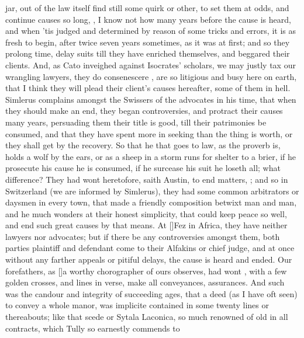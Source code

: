 {jar, out of the law itself find still some quirk or other, to set them
at odds, and continue causes so long, , I know not how
many years before the cause is heard, and when 'tis judged and
determined by reason of some tricks and errors, it is as fresh to
begin, after twice seven years sometimes, as it was at first; and so
they prolong time, delay suits till they have enriched themselves, and
beggared their clients. And, as Cato inveighed against Isocrates'
scholars, we may justly tax our wrangling lawyers, they do consenescere
, are so litigious and busy here on earth, that I think they
will plead their client's causes hereafter, some of them in hell. 
Simlerus complains amongst the Swissers of the advocates in his time,
that when they should make an end, they began controversies, and
protract their causes many years, persuading them their title is good,
till their patrimonies be consumed, and that they have spent more in
seeking than the thing is worth, or they shall get by the recovery. So
that he that goes to law, as the proverb is, holds a wolf by the
ears, or as a sheep in a storm runs for shelter to a brier, if he
prosecute his cause he is consumed, if he surcease his suit he loseth
all; what difference? They had wont heretofore, saith Austin, to
end matters, ; and so in Switzerland (we are
informed by Simlerus), they had some common arbitrators or daysmen
in every town, that made a friendly composition betwixt man and man,
and he much wonders at their honest simplicity, that could keep peace
so well, and end such great causes by that means. At [\baselineskip]Fez in
Africa, they have neither lawyers nor advocates; but if there be any
controversies amongst them, both parties plaintiff and defendant come
to their Alfakins or chief judge, and at once without any farther
appeals or pitiful delays, the cause is heard and ended. Our
forefathers, as [\baselineskip]a worthy chorographer of ours observes, had wont
, with a few golden crosses, and lines in
verse, make all conveyances, assurances. And such was the candour and
integrity of succeeding ages, that a deed (as I have oft seen) to
convey a whole manor, was implicite contained in some twenty lines or
thereabouts; like that scede or Sytala Laconica, so much renowned of
old in all contracts, which Tully so earnestly commends to
}
